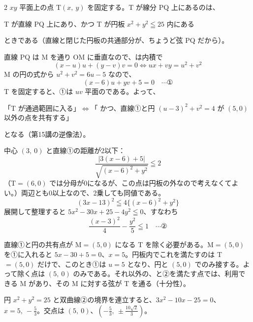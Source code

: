 \documentclass[paper=b5j, fontsize=8pt, fleqn, twoside]{jlreq}
\begin{document}
\begin{multicols*}{2}
  $xy$ 平面上の点 T$(x,\ y)$ を固定する。T が線分 PQ 上にあるのは、
  \par{} T が直線 PQ 上にあり、かつ  T が円板 $x^2+y^2\leqq25$ 内にある\par
  ときである（直線と閉じた円板の共通部分が、ちょうど弦 PQ だから）。\par
  直線 PQ は M を通り OM に垂直なので、は内積で
  \[(x-u)u+(y-v)v=0\iff ux+vy=u^2+v^2\]
  M の円の式から $u^2+v^2=6u-5$ なので、
  \[(x-6)u+yv+5=0\quad\cdots\text{①}\]
  T を固定すると、①は $uv$ 平面のである。よって、
  \par「T が通過範囲に入る」$\iff$「 かつ、直線①と円 $(u-3)^2+v^2=4$ が $(5,0)$ 以外の点を共有する」\par
  となる（第15講の逆像法）。

  中心 $(3,\ 0)$ と直線①の距離が2以下：
  \[\frac{|3(x-6)+5|}{\sqrt{(x-6)^2+y^2}}\leqq2\]
  （T$=(6,0)$ では分母が0になるが、この点は円板の外なので考えなくてよい。）両辺とも0以上なので、2乗しても同値である。
  \[(3x-13)^2\leqq4\{(x-6)^2+y^2\}\]
  展開して整理すると $5x^2-30x+25-4y^2\leqq0$、すなわち
  \[\frac{(x-3)^2}4-\frac{y^2}5\leqq1\quad\cdots\text{②}\]

  直線①と円の共有点が M$=(5,0)$ になる T を除く必要がある。M$=(5,0)$ を①に入れると $5x-30+5=0$、$x=5$。円板内でこれを満たすのは T$=(5,0)$ だけで、このとき①は $u=5$ となり、円と $(5,0)$ でのみ接する。よって除く点は $(5,\ 0)$ のみである。それ以外の、と②を満たす点では、利用できる M があり、その M に対する弦が T を通る（十分性）。

  円 $x^2+y^2=25$ と双曲線②の境界を連立すると、$3x^2-10x-25=0$、$x=5,\ -\frac53$。交点は $(5,\ 0)$、$\left(-\frac53,\ \pm\frac{10\sqrt2}3\right)$。


\end{multicols*}
\end{document}
